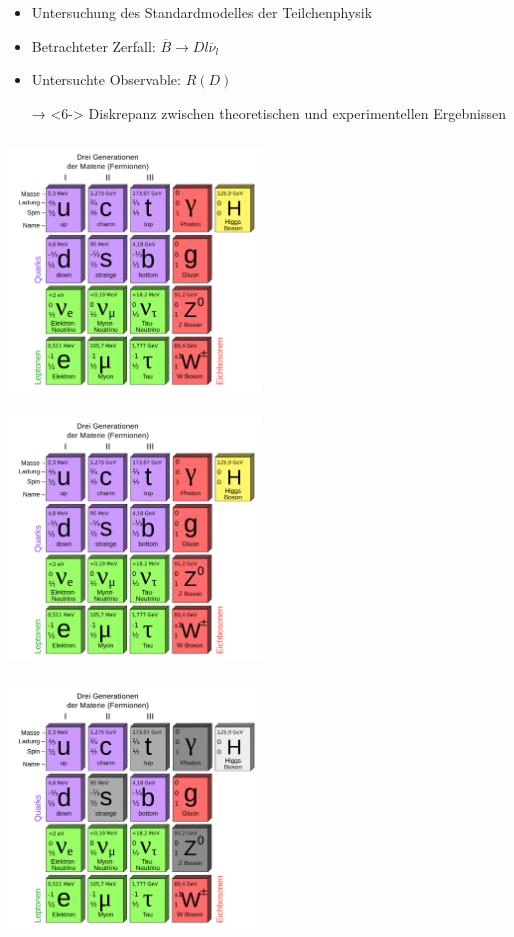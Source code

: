 \documentclass[fleqn, aspectratio=1610, professionalfonts, 9pt]{beamer}
\begin{document}
\begin{frame}
  \begin{minipage}{8cm}
  \begin{itemize}
    \item<2-> Untersuchung des Standardmodelles der Teilchenphysik
    \item<3-> Betrachteter Zerfall: $\overline{B} \to D l \overline{\nu}_l$
    \item<5-> Untersuchte Observable: $R(D)$
    \item[→]<6-> Diskrepanz zwischen theoretischen und experimentellen Ergebnissen
  \end{itemize}
  \end{minipage}%
  \begin{minipage}{7cm}
  \begin{overprint}
    \includegraphics[height=7cm, width=6.7095cm]{Standard_Model_of_Elementary_Particles-de_colorlfull.png}
    \includegraphics[height=7cm, width=6.7095cm]{Standard_Model_of_Elementary_Particles-de_colorlfull.png}
    \includegraphics[height=7cm, width=6.7095cm]{Standard_Model_of_Elementary_Particles-de_colorless.png}

\end{overprint}
\end{minipage}
\end{frame}
\end{document}
